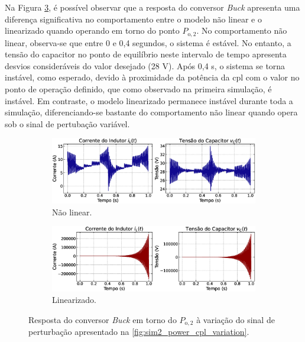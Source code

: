 Na Figura \ref{fig:simulation2_op2}, é possível observar que a resposta do conversor \textit{Buck} apresenta uma diferença significativa no comportamento entre o modelo não linear e o linearizado quando operando em torno do ponto $P_{\mathrm{o}, 2}$. No comportamento não linear, observa-se que entre 0 e 0,4 segundos, o sistema é estável. No entanto, a tensão do capacitor no ponto de equilíbrio neste intervalo de tempo apresenta desvios consideráveis do valor desejado (28 V). Após 0,4 s, o sistema se torna instável, como esperado, devido à proximidade da potência da \acrshort{cpl} com o valor no ponto de operação definido, que como observado na primeira simulação, é instável. Em contraste, o modelo linearizado permanece instável durante toda a simulação, diferenciando-se bastante do comportamento não linear quando opera sob o sinal de pertubação variável.

\begin{figure}[ht]
  \centering
  \captionsetup{justification=centering}
  \begin{subfigure}{1.\textwidth}
    \centering
    \includegraphics[width=1.\textwidth]{figuras/buck/sim2/op2/result_nonlinear.eps}
    \caption{Não linear.}
    \label{fig:sim2_op2_nonlinear}
  \end{subfigure}
  \newline
  \begin{subfigure}{1.\textwidth}
    \centering
    \includegraphics[width=1.\textwidth]{figuras/buck/sim2/op2/result_linear.eps}
    \caption{Linearizado.}
    \label{fig:simulation2_op2_linear}
  \end{subfigure}
  \caption{Resposta do conversor \textit{Buck} em torno do $P_{\mathrm{o}, 2}$ à variação do sinal de perturbação apresentado na \autoref{fig:sim2_power_cpl_variation}.}
  \label{fig:simulation2_op2}
\end{figure}


